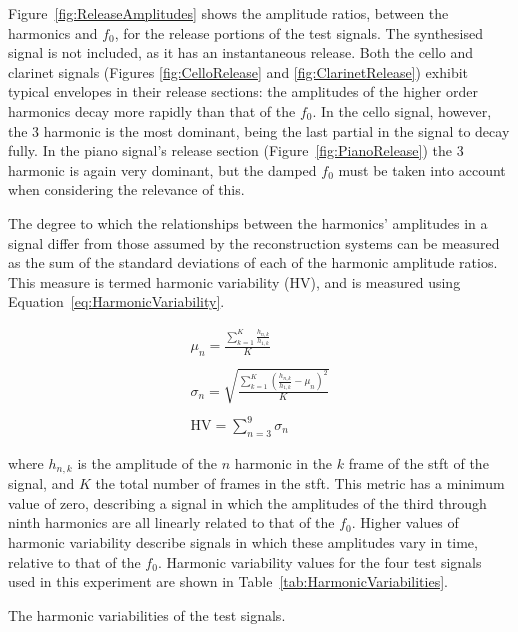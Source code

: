 		Figure~\ref{fig:ReleaseAmplitudes} shows the amplitude ratios, between the harmonics and $f_{0}$, for the
		release portions of the test signals. The synthesised signal is not included, as it has an instantaneous
		release. Both the cello and clarinet signals (Figures \ref{fig:CelloRelease} and \ref{fig:ClarinetRelease})
		exhibit typical envelopes in their release sections: the amplitudes of the higher order harmonics decay
		more rapidly than that of the $f_{0}$. In the cello signal, however, the 3 harmonic is the most
		dominant, being the last partial in the signal to decay fully. In the piano signal's release section
		(Figure~\ref{fig:PianoRelease}) the 3 harmonic is again very dominant, but the damped $f_{0}$
		must be taken into account when considering the relevance of this.

		The degree to which the relationships between the harmonics' amplitudes in a signal differ from those
		assumed by the reconstruction systems can be measured as the sum of the standard deviations of each of the
		harmonic amplitude ratios. This measure is termed harmonic variability ($\mathrm{HV}$), and is measured
		using Equation~\ref{eq:HarmonicVariability}. 		
		
		\begin{gather}
			\mu_{n} = \frac{\sum_{k = 1}^{K} \frac{h_{n,k}}{h_{1,k}}}{K} \nonumber \\
			\nonumber \\
			\sigma_{n} = \sqrt{\frac{\sum_{k = 1}^{K} 
					         \left(\frac{h_{n,k}}{h_{1,k}} - \mu_{n} \right)^{2}}{K}} \nonumber \\
			\nonumber \\
			\mathrm{HV} = \sum_{n = 3}^{9} \sigma_{n}
			\label{eq:HarmonicVariability}
		\end{gather}

		where $h_{n,k}$ is the amplitude of the $n$ harmonic in the $k$ frame of the
		\acrshort{stft} of the signal, and $K$ the total number of frames in the \acrshort{stft}. This metric has a
		minimum value of zero, describing a signal in which the amplitudes of the third through ninth harmonics are
		all linearly related to that of the $f_{0}$. Higher values of harmonic variability describe signals in
		which these amplitudes vary in time, relative to that of the $f_{0}$. Harmonic variability values for the
		four test signals used in this experiment are shown in Table~\ref{tab:HarmonicVariabilities}.

		\begin{table}[h!]
			\centering
			
			\caption{The harmonic variabilities of the test signals.}
			\label{tab:HarmonicVariabilities}
		\end{table}

